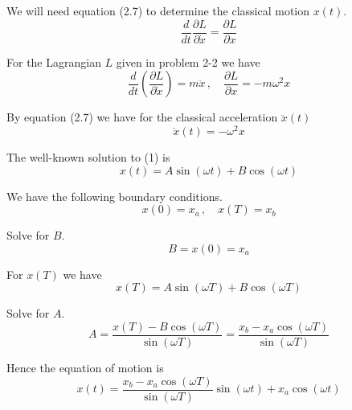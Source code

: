 


\bigskip
We will need equation (2.7) to determine the classical motion $x(t)$.
\begin{equation*}
\frac{d}{dt}\frac{\partial L}{\partial\dot x}=\frac{\partial L}{\partial x}
\tag{2.7}
\end{equation*}

For the Lagrangian $L$ given in problem 2-2 we have
\begin{equation*}
\frac{d}{dt}\left(\frac{\partial L}{\partial\dot x}\right)=m\ddot x\,, %
\quad
\frac{\partial L}{\partial x}=-m\omega^2x
\end{equation*}

By equation (2.7) we have for the classical acceleration $\ddot x(t)$
\begin{equation*}
\ddot x(t)=-\omega^2x
\tag{1}
\end{equation*}

The well-known solution to (1) is
\begin{equation*}
x(t)=A\sin(\omega t)+B\cos(\omega t)
\end{equation*}

We have the following boundary conditions.
\begin{equation*}
x(0)=x_a\,, %
\quad
x(T)=x_b
\end{equation*}

Solve for $B$.
\begin{equation*}
B=x(0)=x_a
\end{equation*}

For $x(T)$ we have
\begin{equation*}
x(T)=A\sin(\omega T)+B\cos(\omega T)
\end{equation*}

Solve for $A$.
\begin{equation*}
A=\frac{x(T)-B\cos(\omega T)}{\sin(\omega T)}=
\frac{x_b-x_a\cos(\omega T)}{\sin(\omega T)}
\end{equation*}

Hence the equation of motion is
\begin{equation*}
x(t)=\frac{x_b-x_a\cos(\omega T)}{\sin(\omega T)}\sin(\omega t)+x_a\cos(\omega t)
\tag{2}
\end{equation*}

